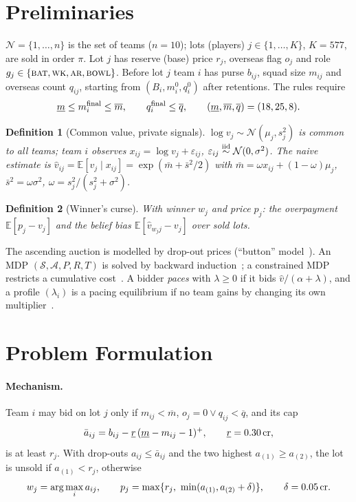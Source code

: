\documentclass{article}
\newtheorem{definition}{Definition}
\newcommand{\E}{\mathbb{E}}
\newcommand{\1}{\mathbb{1}}
\newcommand{\N}{\mathcal{N}}
\newcommand{\crore}{\text{\,cr}}
\begin{document}
\section{Preliminaries}
\label{sec:prelim}
$\N=\{1,\dots,n\}$ is the set of teams ($n=10$); lots (players) $j\in\{1,\dots,K\}$, $K=577$, are sold in order $\pi$. Lot $j$ has reserve (base) price $r_j$, overseas flag $o_j$ and role $g_j\in\{\textsc{bat},\textsc{wk},\textsc{ar},\textsc{bowl}\}$. Before lot $j$ team $i$ has purse $b_{ij}$, squad size $m_{ij}$ and overseas count $q_{ij}$, starting from $(B_i,m_i^0,q_i^0)$ after retentions. The rules require
\begin{equation}
 \underline m\le m_i^{\rm final}\le \overline m,\qquad q_i^{\rm final}\le\overline q,\qquad(\underline m,\overline m,\overline q)=(18,25,8).\label{eq:squad}
\end{equation}
\begin{definition}[Common value, private signals]
$\log v_j\sim\mathcal N(\mu_j,s_j^2)$ is common to all teams; team $i$ observes $x_{ij}=\log v_j+\varepsilon_{ij}$, $\varepsilon_{ij}\stackrel{\rm iid}{\sim}\mathcal N(0,\sigma^2)$. The naive estimate is $\hat v_{ij}=\E[v_j\mid x_{ij}]=\exp(\bar m+\bar s^2/2)$ with $\bar m=\omega x_{ij}+(1-\omega)\mu_j$, $\bar s^2=\omega\sigma^2$, $\omega=s_j^2/(s_j^2+\sigma^2)$.
\end{definition}
\begin{definition}[Winner's curse]
With winner $w_j$ and price $p_j$: the \emph{overpayment} $\E[p_j-v_j]$ and the \emph{belief bias} $\E[\hat v_{w_jj}-v_j]$ over sold lots.
\end{definition}
The ascending auction is modelled by drop-out prices (``button'' model~\citep{krishna2009}). An MDP $(\mathcal S,\mathcal A,P,R,T)$ is solved by backward induction~\citep{puterman1994}; a constrained MDP restricts a cumulative cost~\citep{altman1999}. A bidder \emph{paces} with $\lambda\ge0$ if it bids $\hat v/(\alpha+\lambda)$, and a profile $(\lambda_i)$ is a pacing equilibrium if no team gains by changing its own multiplier~\citep{conitzer2022}.

\section{Problem Formulation}
\label{sec:formulation}
\paragraph{Mechanism.} Team $i$ may bid on lot $j$ only if $m_{ij}<\overline m$, $o_j=0\vee q_{ij}<\overline q$, and its cap
\begin{equation}
 \bar a_{ij}=b_{ij}-\underline r\,(\underline m-m_{ij}-1)^+,\qquad \underline r=0.30\crore,\label{eq:cap}
\end{equation}
is at least $r_j$. With drop-outs $a_{ij}\le\bar a_{ij}$ and the two highest $a_{(1)}\ge a_{(2)}$, the lot is unsold if $a_{(1)}<r_j$, otherwise
\begin{equation}
 w_j=\arg\max_i a_{ij},\qquad p_j=\max\{r_j,\ \min(a_{(1)},a_{(2)}+\delta)\},\qquad\delta=0.05\crore.\label{eq:mech}
\end{equation}
\end{document}
